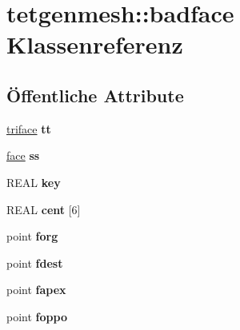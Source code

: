 \hypertarget{classtetgenmesh_1_1badface}{\section{tetgenmesh\-:\-:badface Klassenreferenz}
\label{classtetgenmesh_1_1badface}
}
\subsection*{Öffentliche Attribute}
\begin{DoxyCompactItemize}
\item 
\hypertarget{classtetgenmesh_1_1badface_a01d24569e6058b3dae1a31e0638b849c}{\hyperlink{classtetgenmesh_1_1triface}{triface} {\bfseries tt}}\label{classtetgenmesh_1_1badface_a01d24569e6058b3dae1a31e0638b849c}

\item 
\hypertarget{classtetgenmesh_1_1badface_ace098878b5e89ec387c959d8acd0153d}{\hyperlink{classtetgenmesh_1_1face}{face} {\bfseries ss}}\label{classtetgenmesh_1_1badface_ace098878b5e89ec387c959d8acd0153d}

\item 
\hypertarget{classtetgenmesh_1_1badface_ac94189eb4b728abd589597c89db9a1d7}{R\-E\-A\-L {\bfseries key}}\label{classtetgenmesh_1_1badface_ac94189eb4b728abd589597c89db9a1d7}

\item 
\hypertarget{classtetgenmesh_1_1badface_a72958cf685f881af15213f0925ccf72a}{R\-E\-A\-L {\bfseries cent} \mbox{[}6\mbox{]}}\label{classtetgenmesh_1_1badface_a72958cf685f881af15213f0925ccf72a}

\item 
\hypertarget{classtetgenmesh_1_1badface_a620b94f643bafaa7a4dbfeba7063a445}{point {\bfseries forg}}\label{classtetgenmesh_1_1badface_a620b94f643bafaa7a4dbfeba7063a445}

\item 
\hypertarget{classtetgenmesh_1_1badface_a8e010478b28c997ad9b441d05df47695}{point {\bfseries fdest}}\label{classtetgenmesh_1_1badface_a8e010478b28c997ad9b441d05df47695}

\item 
\hypertarget{classtetgenmesh_1_1badface_a617348221ce387b323575110a5c79627}{point {\bfseries fapex}}\label{classtetgenmesh_1_1badface_a617348221ce387b323575110a5c79627}

\item 
\hypertarget{classtetgenmesh_1_1badface_a8e9966e480c210ac83ab0a4c221a7000}{point {\bfseries foppo}}\label{classtetgenmesh_1_1badface_a8e9966e480c210ac83ab0a4c221a7000}


\end{DoxyCompactItemize}
